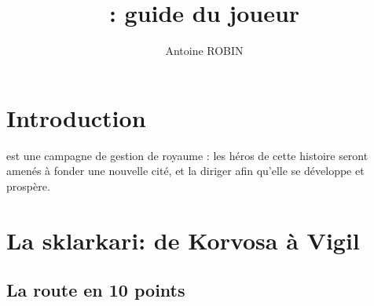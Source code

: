 \documentclass[letterpaper,10pt,twoside,twocolumn,openany]{book}
\title{\nomcampagne : guide du joueur}
\date{}
\author{Antoine ROBIN}
\begin{document}
\maketitle
\tableofcontents
\chapter{Introduction}
\nomcampagne est une campagne de gestion de royaume : les héros de cette histoire seront amenés à fonder une nouvelle cité, et la diriger afin qu'elle se développe et prospère.
\chapter{La sklarkari: de Korvosa à Vigil}
\section{La route en 10 points}
\end{document}
